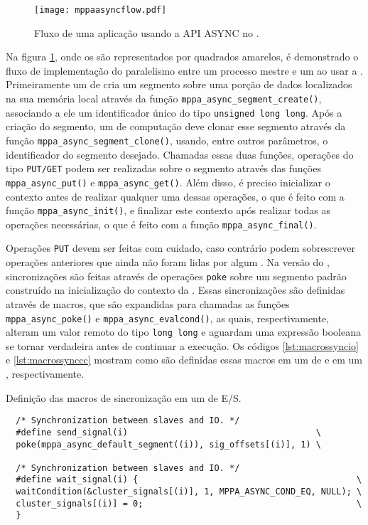 \begin{figure}[tb]
  \centering
  \caption{Fluxo de uma aplicação usando a API ASYNC no \mppa.}
  \label{fig:mppaasyncflow}
  \texttt{[image: mppaasyncflow.pdf]}
\end{figure}

Na figura \ref{fig:mppaasyncflow}, onde os \clusters são representados por quadrados amarelos, é demonstrado o fluxo de implementação do paralelismo entre um processo mestre e um \CC ao usar a \ASYNC. Primeiramente um \cluster de \IO cria um segmento sobre uma porção de dados localizados na sua memória local através da função \texttt{mppa\_async\_segment\_create()}, associando a ele um identificador único do tipo \texttt{unsigned long long}. Após a criação do segmento, um \cluster de computação deve clonar esse segmento através da função \texttt{mppa\_async\_segment\_clone()}, usando, entre outros parâmetros, o identificador do segmento desejado. Chamadas essas duas funções, operações do tipo \texttt{PUT/GET} podem ser realizadas sobre o segmento através das funções \texttt{mppa\_async\_put()} e \texttt{mppa\_async\_get()}. Além disso, é preciso inicializar o contexto antes de realizar qualquer uma dessas operações, o que é feito com a função \texttt{mppa\_async\_init()}, e finalizar este contexto após realizar todas as operações necessárias, o que é feito com a função \texttt{mppa\_async\_final()}.

Operações \texttt{PUT} devem ser feitas com cuidado, caso contrário podem sobrescrever operações anteriores que ainda não foram lidas por algum \cluster. Na versão \ASYNC do \capb, sincronizações são feitas através de operações \texttt{poke} sobre um segmento padrão construído na inicialização do contexto da \API. Essas sincronizações são definidas através de macros, que são expandidas para chamadas as funções \texttt{mppa\_async\_poke()} e \texttt{mppa\_async\_evalcond()}, as quais, respectivamente, alteram um valor remoto do tipo \texttt{long long} e aguardam uma expressão booleana se tornar verdadeira antes de continuar a execução. Os códigos \ref{lst:macrossyncio} e \ref{lst:macrossynccc} mostram como são definidas essas macros em um \cluster de \IO e em um \CC, respectivamente.

\begin{listing}[tb]
\caption{Definição das macros de sincronização em um \cluster de E/S.}
\label{lst:macrossyncio}
\begin{verbatim}
  /* Synchronization between slaves and IO. */
  #define send_signal(i)                                     \
  poke(mppa_async_default_segment((i)), sig_offsets[(i)], 1) \

  /* Synchronization between slaves and IO. */
  #define wait_signal(i) {                                           \
  waitCondition(&cluster_signals[(i)], 1, MPPA_ASYNC_COND_EQ, NULL); \
  cluster_signals[(i)] = 0;                                          \
  }   
\end{verbatim}
\fonte{o autor.}
\end{listing}

